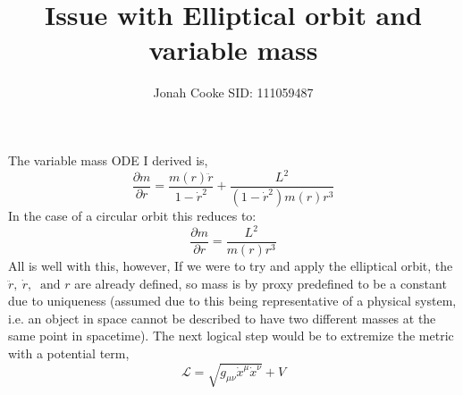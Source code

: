 \documentclass{article}
\title{Issue with Elliptical orbit and variable mass}
\author{Jonah Cooke SID: 111059487}
\begin{document}
\maketitle

The variable mass ODE I derived is,
\[\frac{\partial m}{\partial r}=\frac{m(r)\ddot{r}}{1-\dot{r}^2}+\frac{L^2}{(1-\dot{r}^2)m(r)r^3}\]
In the case of a circular orbit this reduces to:
\[\frac{\partial m}{\partial r}=\frac{L^2}{m(r)r^3}\]
All is well with this, however, If we were to try and apply the elliptical orbit, the $\ddot{r},\:\dot{r},\:\text{ and }r$ are already defined, so mass is by proxy predefined to be a constant due to uniqueness (assumed due to this being representative of a physical system, i.e. an object in space cannot be described to have two different masses at the same point in spacetime). The next logical step would be to extremize the metric with a potential term, 
\[\mathcal{L} = \sqrt{g_{\mu\nu}\dot{x}^\mu\dot{x}^\nu} + V \]
\end{document}
